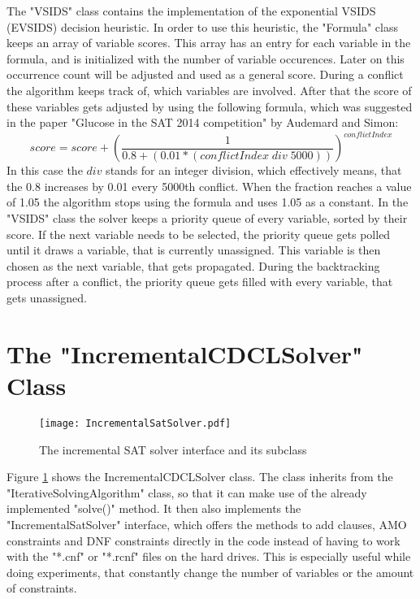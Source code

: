 The "VSIDS" class contains the implementation of the exponential VSIDS (EVSIDS) decision heuristic. In order to use this heuristic, the "Formula" class keeps an array of variable scores. This array has an entry for each variable in the formula, and is initialized with the number of variable occurences. Later on this occurrence count will be adjusted and used as a general score. During a conflict the algorithm keeps track of, which variables are involved. After that the score of these variables gets adjusted by using the following formula, which was suggested in the paper "Glucose in the SAT 2014 competition" \cite{audemard2014glucose} by Audemard and Simon:
\begin{displaymath}
score = score + (\frac{1}{0.8 + (0.01 * (conflictIndex \; div \; 5000))})^{conflictIndex}
\end{displaymath}
In this case the $div$ stands for an integer division, which effectively means, that the 0.8 increases by 0.01 every 5000th conflict. When the fraction reaches a value of 1.05 the algorithm stops using the formula and uses 1.05 as a constant.
In the "VSIDS" class the solver keeps a priority queue of every variable, sorted by their score. If the next variable needs to be selected, the priority queue gets polled until it draws a variable, that is currently unassigned. This variable is then chosen as the next variable, that gets propagated. During the backtracking process after a conflict, the priority queue gets filled with every variable, that gets unassigned.

\section{The "IncrementalCDCLSolver" Class}

\begin{figure}[H]
  \centering
  \texttt{[image: IncrementalSatSolver.pdf]}
  \caption{The incremental SAT solver interface and its subclass}
  \label{fig:incrementalSAT}
\end{figure}

Figure \ref{fig:incrementalSAT} shows the IncrementalCDCLSolver class. The class inherits from the "IterativeSolvingAlgorithm" class, so that it can make use of the already implemented "solve()" method. It then also implements the "IncrementalSatSolver" interface, which offers the methods to add clauses, AMO constraints and DNF constraints directly in the code instead of having to work with the "*.cnf" or "*.rcnf" files on the hard drives. This is especially useful while doing experiments, that constantly change the number of variables or the amount of constraints.
